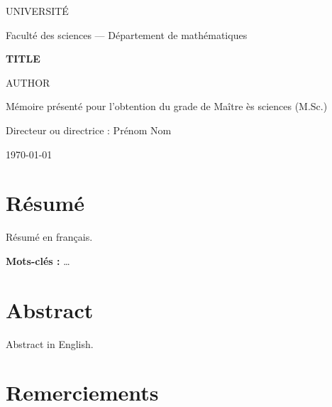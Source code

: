 \documentclass[12pt,oneside]{report}
\theoremstyle{plain}
\theoremstyle{definition}
\theoremstyle{remark}
\begin{document}
\begin{titlepage}
  \centering
  {\large UNIVERSITÉ\par}
  {\large Faculté des sciences — Département de mathématiques\par}
  \vspace{3cm}
  {\LARGE\bfseries {{TITLE}}\par}
  \vspace{2cm}
  {\Large {{AUTHOR}}\par}
  \vspace{1.5cm}
  Mémoire présenté pour l'obtention du grade de Maître ès sciences (M.Sc.)\par
  \vfill
  {\large Directeur ou directrice : Prénom Nom\par}
  \vspace{1cm}
  {\large \today\par}
\end{titlepage}

\chapter*{Résumé}
Résumé en français.

\textbf{Mots-clés :} \dots

\chapter*{Abstract}
\begin{otherlanguage}{english}Abstract in English.\end{otherlanguage}

\chapter*{Remerciements}

\tableofcontents
\listoffigures

\cleardoublepage
{}





\appendix




\end{document}
